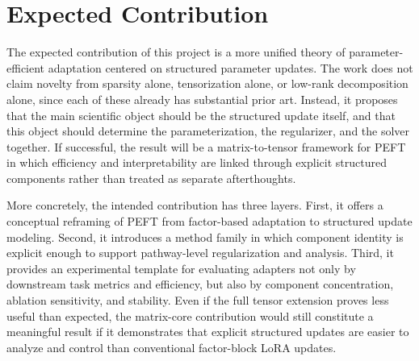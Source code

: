 \documentclass[11pt]{article}
\begin{document}
\section{Expected Contribution}

The expected contribution of this project is a more unified theory of parameter-efficient adaptation centered on structured parameter updates. The work does not claim novelty from sparsity alone, tensorization alone, or low-rank decomposition alone, since each of these already has substantial prior art. Instead, it proposes that the main scientific object should be the structured update itself, and that this object should determine the parameterization, the regularizer, and the solver together. If successful, the result will be a matrix-to-tensor framework for PEFT in which efficiency and interpretability are linked through explicit structured components rather than treated as separate afterthoughts.

More concretely, the intended contribution has three layers. First, it offers a conceptual reframing of PEFT from factor-based adaptation to structured update modeling. Second, it introduces a method family in which component identity is explicit enough to support pathway-level regularization and analysis. Third, it provides an experimental template for evaluating adapters not only by downstream task metrics and efficiency, but also by component concentration, ablation sensitivity, and stability. Even if the full tensor extension proves less useful than expected, the matrix-core contribution would still constitute a meaningful result if it demonstrates that explicit structured updates are easier to analyze and control than conventional factor-block LoRA updates.
\end{document}
